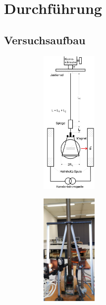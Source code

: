 \newpage
\section{Durchführung}
\label{sec:Durchfuehrung} %
\subsection{Versuchsaufbau}

\begin{figure}[h]
    \begin{subfigure}[c]{0.5\textwidth}
        \centering
        \includegraphics[width=0.3\textwidth, height=0.7\textwidth]{bilder/magnet_apperatur.jpeg}
        \label{fig:Torsion_apperatur}
    \end{subfigure}
    \begin{subfigure}[c]{0.5\textwidth}
        \centering
        \includegraphics[width=0.3\textwidth, height=0.7\textwidth]{bilder/Foto_Versuchsaufbau.jpeg}
        \label{fig:Foto_Versuchsaufbau}
    \end{subfigure}
\end{figure}

